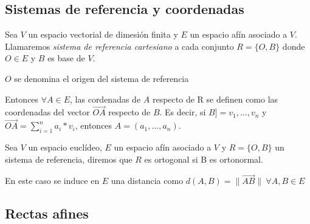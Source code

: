 \subsection{Sistemas de referencia y coordenadas}

\begin{ndef}
Sea $V$ un espacio vectorial de dimesión finita y $E$ un espacio afín asociado a $V$. Llamaremos \textit{ sistema de referencia cartesiano } a cada conjunto $R=\{O,B\}$ donde $O\in E$ y $B$ es base de $V$.

$O$ se denomina el origen del sistema de referencia

\end{ndef}

Entonces $\forall A \in E$, las cordenadas de $A$ respecto de R se definen como las coordenadas del vector $\vec{OA}$ respecto de $B$. Es decir, si $B] = v_1, ... ,v_n $ y $\vec{OA} = \sum_{i=1}^{n} a_i*v_i$, entonces $A = (a_1,..., a_n)$.

\begin{ndef}
Sea $V$ un espacio euclídeo, $E$ un espacio afín asociado a $V$ y $R=\{O,B\}$ un sistema de referencia, diremos que $R$ es ortogonal si B es ortonormal.

\end{ndef}

En este caso se induce en $E$ una distancia como $d(A,B) = \|\vec{AB}\|\ \forall A,B \in E$








\subsection{Rectas afines}

